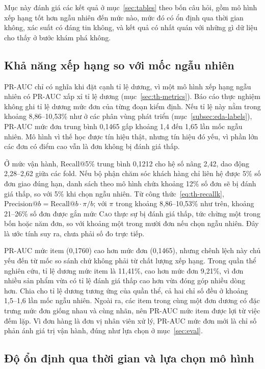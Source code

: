 Mục này đánh giá các kết quả ở mục~\ref{sec:tables} theo bốn câu hỏi, gồm mô hình xếp hạng tốt hơn ngẫu nhiên đến mức nào, mức đó có ổn định qua thời gian không, xác suất có đáng tin không, và kết quả có nhất quán với những gì dữ liệu cho thấy ở bước khám phá không.

\subsection{Khả năng xếp hạng so với mốc ngẫu nhiên}\label{sec:analysis-ranking}

PR-AUC chỉ có nghĩa khi đặt cạnh tỉ lệ dương, vì một mô hình xếp hạng ngẫu nhiên có PR-AUC xấp xỉ tỉ lệ dương (mục~\ref{sec:th-metrics}). Báo cáo thực nghiệm không ghi tỉ lệ dương mức đơn của từng đoạn kiểm định. Nếu tỉ lệ này nằm trong khoảng 8,86--10,53\% như ở các phân vùng phát triển (mục~\ref{subsec:eda-labels}), PR-AUC mức đơn trung bình 0,1465 gấp khoảng 1,4 đến 1,65 lần mốc ngẫu nhiên. Mô hình vì thế học được tín hiệu thật, nhưng tín hiệu đó yếu, vì phần lớn các đơn có điểm cao vẫn là đơn không bị đánh giá thấp.

Ở mức vận hành, Recall@5\% trung bình 0,1212 cho hệ số nâng 2,42, dao động 2,28--2,62 giữa các fold. Nếu bộ phận chăm sóc khách hàng chỉ liên hệ được 5\% số đơn giao đúng hạn, danh sách theo mô hình chứa khoảng 12\% số đơn sẽ bị đánh giá thấp, so với 5\% khi chọn ngẫu nhiên. Từ công thức~\eqref{eq:th-recallk}, $\mathrm{Precision@}b = \mathrm{Recall@}b \cdot \pi / b$; với $\pi$ trong khoảng 8,86--10,53\% như trên, khoảng 21--26\% số đơn được gắn mức \textsc{Cao} thực sự bị đánh giá thấp, tức chừng một trong bốn hoặc năm đơn, so với khoảng một trong mười đơn nếu chọn ngẫu nhiên. Đây là ước tính suy ra, chưa phải số đo trực tiếp.

PR-AUC mức item (0,1760) cao hơn mức đơn (0,1465), nhưng chênh lệch này chủ yếu đến từ mốc so sánh chứ không phải từ chất lượng xếp hạng. Trong quần thể nghiên cứu, tỉ lệ dương mức item là 11,41\%, cao hơn mức đơn 9,21\%, vì đơn nhiều sản phẩm vừa có tỉ lệ đánh giá thấp cao hơn vừa đóng góp nhiều dòng hơn. Chia cho tỉ lệ dương tương ứng của quần thể, cả hai chỉ số đều ở khoảng 1,5--1,6 lần mốc ngẫu nhiên. Ngoài ra, các item trong cùng một đơn dương có đặc trưng mức đơn giống nhau và cùng nhãn, nên PR-AUC mức item được lợi từ việc đếm lặp. Vì đơn hàng là đơn vị nhân viên xử lý, PR-AUC mức đơn mới là chỉ số phản ánh giá trị vận hành, đúng như lựa chọn ở mục~\ref{sec:eval}.

\subsection{Độ ổn định qua thời gian và lựa chọn mô hình}\label{sec:analysis-stability}

